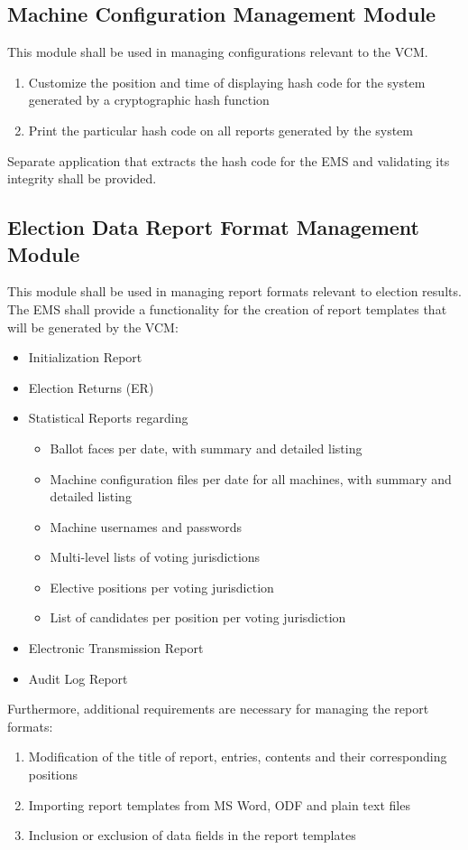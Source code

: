 \documentclass[a4paper, 11pt]{article}
\begin{document}
\subsection{Machine Configuration Management Module}
This module shall be used in managing configurations relevant to the VCM.
\begin{enumerate}
	\item Customize the position and time of displaying hash code for the system generated by a cryptographic hash function
	\item Print the particular hash code on all reports generated by the system
\end{enumerate}
Separate application that extracts the hash code for the EMS and validating its integrity shall be provided.

\subsection{Election Data Report Format Management Module}
This module shall be used in managing report formats relevant to election results.
The EMS shall provide a functionality for the creation of report templates that will be generated by the VCM:
\begin{itemize}
	\item Initialization Report
	\item Election Returns (ER)
	\item Statistical Reports regarding
	\begin{itemize}
		\item Ballot faces per date, with summary and detailed listing
		\item Machine configuration files per date for all machines, with summary and detailed listing
		\item Machine usernames and passwords
		\item Multi-level lists of voting jurisdictions
		\item Elective positions per voting jurisdiction
		\item List of candidates per position per voting jurisdiction
	\end{itemize}
	\item Electronic Transmission Report
	\item Audit Log Report
\end{itemize}
Furthermore, additional requirements are necessary for managing the report formats:
\begin{enumerate}
	\item Modification of the title of report, entries, contents and their corresponding positions
	\item Importing report templates from MS Word, ODF and plain text files
	\item Inclusion or exclusion of data fields in the report templates
\end{enumerate}
\end{document}
